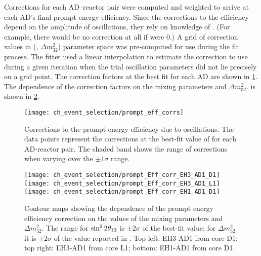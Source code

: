 Corrections for each AD--reactor pair were computed
and weighted to arrive at each AD's final prompt energy efficiency.
Since the corrections to the efficiency depend on
the amplitude of \nuebar{} oscillations, they rely on knowledge of \thetaot.
(For example, there would be no correction at all if \thetaot{} were $0$.)
A grid of correction values in (\thetaot{}, $\Delta m^2_{32}$) parameter space
was pre-computed for use during the fit process.
The fitter used a linear interpolation to estimate the correction to use
during a given iteration when the trial oscillation parameters
did not lie precisely on a grid point.
The correction factors at the best fit \thetaot{}
for each AD are shown in \cref{fig:prompt_eff_osc}.
The dependence of the correction factors on the mixing parameters \thetaot{} and $\Delta m^2_{32}$.
is shown in \cref{fig:prompt_eff_osc_contour}.

\begin{figure}
    \centering
    \texttt{[image: ch\_event\_selection/prompt\_eff\_corrs]}
    \caption[Prompt efficiency corrections due to oscillation effects]{
        Corrections to the prompt energy efficiency due to \nuebar{} oscillations.
        The data points represent the corrections at the best-fit
        value of \thetaot{} for each AD-reactor pair.
        The shaded band shows the range of corrections when varying \thetaot{}
        over the $\pm1\sigma$ range.
    }
    \label{fig:prompt_eff_osc}
\end{figure}

\begin{figure}
    \centering
    \texttt{[image: ch\_event\_selection/prompt\_Eff\_corr\_EH3\_AD1\_D1]}
    \texttt{[image: ch\_event\_selection/prompt\_Eff\_corr\_EH3\_AD1\_L1]}
    \\
    \texttt{[image: ch\_event\_selection/prompt\_Eff\_corr\_EH1\_AD1\_D1]}
    \caption[Prompt efficiency correction contour maps]{
        Contour maps showing the dependence of the prompt energy efficiency correction
        on the values of the mixing parameters \thetaot{} and $\Delta m^2_{32}$.
        The range for $\sin^22\theta_{13}{}$ is $\pm2\sigma$ of the best-fit value;
        for $\Delta m^2_{32}$ it is $\pm2\sigma$ of the value reported in \cite{ngd2018}.
        Top left: EH3-AD1 from core D1;
        top right: EH3-AD1 from core L1;
        bottom: EH1-AD1 from core D1.
    }
    \label{fig:prompt_eff_osc_contour}
\end{figure}

